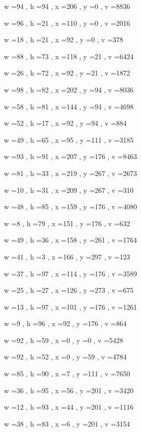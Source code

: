 \documentclass[11pt]{article}
\begin{document}
w =94 , h =94 , x =206 , y =0 , v =8836
\par
w =96 , h =21 , x =110 , y =0 , v =2016
\par
w =18 , h =21 , x =92 , y =0 , v =378
\par
w =88 , h =73 , x =118 , y =21 , v =6424
\par
w =26 , h =72 , x =92 , y =21 , v =1872
\par
w =98 , h =82 , x =202 , y =94 , v =8036
\par
w =58 , h =81 , x =144 , y =94 , v =4698
\par
w =52 , h =17 , x =92 , y =94 , v =884
\par
w =49 , h =65 , x =95 , y =111 , v =3185
\par
w =93 , h =91 , x =207 , y =176 , v =8463
\par
w =81 , h =33 , x =219 , y =267 , v =2673
\par
w =10 , h =31 , x =209 , y =267 , v =310
\par
w =48 , h =85 , x =159 , y =176 , v =4080
\par
w =8 , h =79 , x =151 , y =176 , v =632
\par
w =49 , h =36 , x =158 , y =261 , v =1764
\par
w =41 , h =3 , x =166 , y =297 , v =123
\par
w =37 , h =97 , x =114 , y =176 , v =3589
\par
w =25 , h =27 , x =126 , y =273 , v =675
\par
w =13 , h =97 , x =101 , y =176 , v =1261
\par
w =9 , h =96 , x =92 , y =176 , v =864
\par
w =92 , h =59 , x =0 , y =0 , v =5428
\par
w =92 , h =52 , x =0 , y =59 , v =4784
\par
w =85 , h =90 , x =7 , y =111 , v =7650
\par
w =36 , h =95 , x =56 , y =201 , v =3420
\par
w =12 , h =93 , x =44 , y =201 , v =1116
\par
w =38 , h =83 , x =6 , y =201 , v =3154
\par
\newpage
\end{document}
